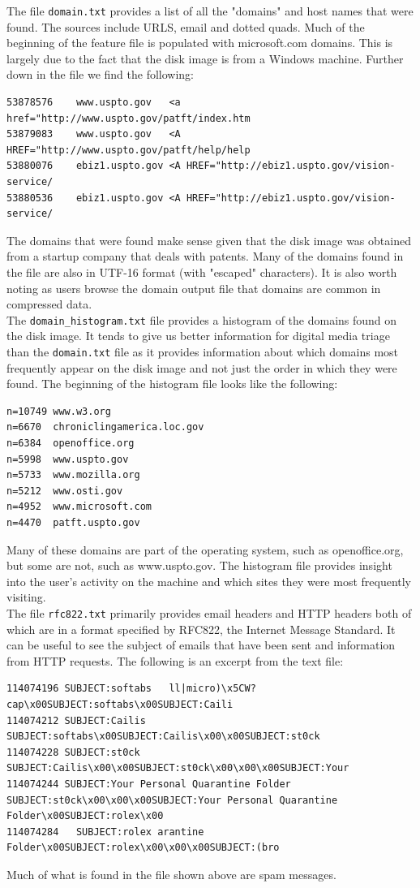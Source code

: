 The file \texttt{domain.txt} provides a list of all the "domains" and host names that were found. The sources include URLS, email and dotted quads. Much of the beginning of the feature file is populated with microsoft.com domains. This is largely due to the fact that the disk image is from a Windows machine. Further down in the file we find the following:
\lstset{style=customfile}
\begin{lstlisting}
53878576	www.uspto.gov	<a href="http://www.uspto.gov/patft/index.htm
53879083	www.uspto.gov	<A HREF="http://www.uspto.gov/patft/help/help
53880076	ebiz1.uspto.gov	<A HREF="http://ebiz1.uspto.gov/vision-service/
53880536	ebiz1.uspto.gov	<A HREF="http://ebiz1.uspto.gov/vision-service/
\end{lstlisting}

The domains that were found make sense given that the disk image was obtained from a startup company that deals with patents. Many of the domains found in the file are also in UTF-16 format (with "escaped" characters). It is also worth noting as users browse the domain output file that domains are common in compressed data.\\

The \texttt{domain\_histogram.txt} file provides a histogram of the domains found on the disk image. It tends to give us better information for digital media triage than the \texttt{domain.txt} file as it provides information about which domains most frequently appear on the disk image and not just the order in which they were found. The beginning of the histogram file looks like the following:
\lstset{style=customfile}
\begin{lstlisting}
n=10749	www.w3.org
n=6670	chroniclingamerica.loc.gov
n=6384	openoffice.org
n=5998	www.uspto.gov
n=5733	www.mozilla.org
n=5212	www.osti.gov
n=4952	www.microsoft.com
n=4470	patft.uspto.gov
\end{lstlisting}

Many of these domains are part of the operating system, such as openoffice.org, but some are not, such as www.uspto.gov. The histogram file provides insight into the user's activity on the machine and which sites they were most frequently visiting. \\

The file \texttt{rfc822.txt} primarily provides email headers and HTTP headers both of which are in a format specified by RFC822, the Internet Message Standard. It can be useful to see the subject of emails that have been sent and information from HTTP requests. The following is an excerpt from the text file:
\lstset{style=customfile}
\begin{lstlisting}
114074196 SUBJECT:softabs	ll|micro)\x5CW?cap\x00SUBJECT:softabs\x00SUBJECT:Caili
114074212 SUBJECT:Cailis	SUBJECT:softabs\x00SUBJECT:Cailis\x00\x00SUBJECT:st0ck
114074228 SUBJECT:st0ck	SUBJECT:Cailis\x00\x00SUBJECT:st0ck\x00\x00\x00SUBJECT:Your
114074244 SUBJECT:Your Personal Quarantine Folder
SUBJECT:st0ck\x00\x00\x00SUBJECT:Your Personal Quarantine Folder\x00SUBJECT:rolex\x00
114074284	SUBJECT:rolex arantine Folder\x00SUBJECT:rolex\x00\x00\x00SUBJECT:(bro
\end{lstlisting}
Much of what is found in the file shown above are spam messages.\\

